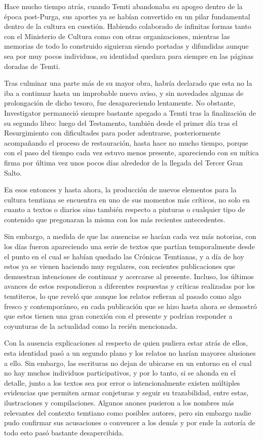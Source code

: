 \documentclass[
]{book}
\begin{document}
Hace mucho tiempo atrás, cuando Temti abandonaba su apogeo dentro de la época post-Purga, sus aportes ya se habían convertido en un pilar fundamental dentro de la cultura en cuestión. Habiendo colaborado de infinitas formas tanto con el Ministerio de Cultura como con otras organizaciones, mientras las memorias de todo lo construido siguieran siendo portadas y difundidas aunque sea por muy pocos individuos, su identidad quedara para siempre en las páginas doradas de Temti.

Tras culminar una parte más de su mayor obra, habría declarado que esta no la iba a continuar hasta un improbable nuevo aviso, y sin novedades algunas de prolongación de dicho tesoro, fue desapareciendo lentamente. No obstante, Investigator permaneció siempre bastante apegado a Temti tras la finalización de su segundo libro: luego del Testamento, también desde el primer día tras el Resurgimiento con dificultades para poder adentrarse, posteriormente acompañando el proceso de restauración, hasta hace no mucho tiempo, porque con el paso del tiempo cada vez estuvo menos presente, apareciendo con su mítica firma por última vez unos pocos días alrededor de la llegada del Tercer Gran Salto.

En esos entonces y hasta ahora, la producción de nuevos elementos para la cultura temtiana se encuentra en uno de sus momentos más críticos, no solo en cuanto a textos o diarios sino también respecto a pinturas o cualquier tipo de contenido que pregonaran la misma con los más recientes antecedentes.

Sin embargo, a medida de que las ausencias se hacían cada vez más notorias, con los días fueron apareciendo una serie de textos que partían temporalmente desde el punto en el cual se habían quedado las Crónicas Temtianas, y a día de hoy estos ya se vienen haciendo muy regulares, con recientes publicaciones que demuestran intenciones de continuar y acercarse al presente. Incluso, los últimos avances de estos respondieron a diferentes respuestas y críticas realizadas por los temtiteros, lo que reveló que aunque los relatos refieran al pasado como algo fresco y contemporáneo, en cada publicación que se hizo hasta ahora se demostró que estos tienen una gran conexión con el presente y podrían responder a coyunturas de la actualidad como la recién mencionada.

Con la ausencia explicaciones al respecto de quien pudiera estar atrás de ellos, esta identidad pasó a un segundo plano y los relatos no harían mayores alusiones a ello. Sin embargo, las escrituras no dejan de ubicarse en un entorno en el cual no hay muchos individuos participativos, y por lo tanto, si se ahonda en el detalle, junto a los textos sea por error o intencionalmente existen múltiples evidencias que permiten armar conjeturas y seguir su trazabilidad, entre estas, ilustraciones y compilaciones. Algunos anones pusieron a los nombres más relevantes del contexto temtiano como posibles autores, pero sin embargo nadie pudo confirmar sus acusaciones o convencer a los demás y por ende la autoría de todo esto pasó bastante desapercibida.
\end{document}
